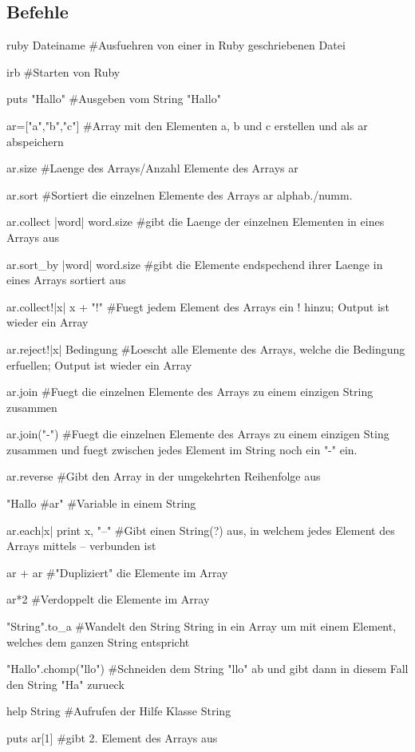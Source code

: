 \documentclass[10pt,a4paper]{scrartcl}
\begin{document}
\subsection{Befehle}
\begin{terminalcode}
ruby Dateiname	#Ausfuehren von einer in Ruby geschriebenen Datei	

irb #Starten von Ruby

puts "Hallo"	#Ausgeben vom String "Hallo"


ar=["a","b","c"]	#Array mit den Elementen a, b und c erstellen und als ar abspeichern

ar.size		#Laenge des Arrays/Anzahl Elemente des Arrays ar 

ar.sort		#Sortiert die einzelnen Elemente des Arrays ar alphab./numm.

ar.collect { |word| word.size}	#gibt die Laenge der einzelnen Elementen in eines Arrays aus

ar.sort_by { |word| word.size}	#gibt die Elemente endspechend ihrer Laenge in eines Arrays sortiert aus

ar.collect!{|x| x + "!"}	#Fuegt jedem Element des Arrays ein ! hinzu; Output ist wieder ein Array

ar.reject!{|x| Bedingung}	#Loescht alle Elemente des Arrays, welche die Bedingung erfuellen; Output ist wieder ein Array

ar.join				#Fuegt die einzelnen Elemente des Arrays zu einem einzigen String zusammen

ar.join("-")			#Fuegt die einzelnen Elemente des Arrays zu einem einzigen Sting zusammen und fuegt zwischen jedes Element im String noch ein "-" ein.

ar.reverse			#Gibt den Array in der umgekehrten Reihenfolge aus

"Hallo #{ar}"			#Variable in einem String

ar.each{|x| print x, "--"}	#Gibt einen String(?) aus, in welchem jedes Element des Arrays mittels -- verbunden ist

ar + ar				#"Dupliziert" die Elemente im Array

ar*2				#Verdoppelt die Elemente im Array

"String".to_a			#Wandelt den String String in ein Array um mit einem Element, welches dem ganzen String entspricht

"Hallo".chomp("llo")		#Schneiden dem String "llo" ab und gibt dann in diesem Fall den String "Ha" zurueck 

help String			#Aufrufen der Hilfe Klasse String

puts ar[1]			#gibt 2. Element des Arrays aus

\end{terminalcode}
\end{document}

